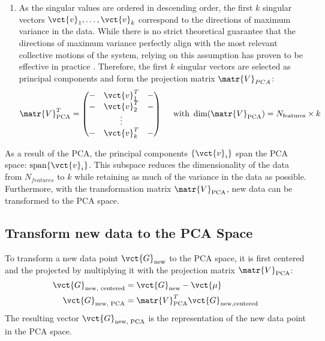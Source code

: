 \begin{enumerate}
    \item As the singular values are ordered in descending order, the first $k$ singular vectors $\vct{v}_1, \dots, \vct{v}_k$ correspond to the directions of maximum variance in the data.
    While there is no strict theoretical guarantee that the directions of maximum variance perfectly align with the most relevant collective motions of the system, 
    relying on this assumption has proven to be effective in practice \cite{Schaefer2025} \cite{sicard:hal-00994220}. 
    Therefore, the first $k$ singular vectors are selected as principal components and form the projection matrix $\matr{V}_{PCA}$:
    \begin{align}
    \matr{V}_{\text{PCA}}^T =
    \begin{pmatrix}
        - & \vct{v}_1^T & - \\
        - & \vct{v}_2^T & - \\
        & \vdots & \\
        - & \vct{v}_k^T & -
    \end{pmatrix}
    \quad  \text{ with } \dim(\matr{V}_{\text{PCA}}) = N_{\text{features}} \times k
    \end{align}

\end{enumerate}
As a result of the PCA, the principal components $\{\vct{v}_i\}$ span the PCA space: $\operatorname{span}\{\vct{v}_i\}$.
This subspace reduces the dimensionality of the data from $N_{features}$ to $k$ while retaining as much of the variance in the data as possible.
Furthermore, with the transformation matrix $\matr{V}_{\text{PCA}}$, new data can be transformed to the PCA space.

\subsection{Transform new data to the PCA Space}
\label{sec:transform_pca}
To transform a new data point $\vct{G}_{\text{new}}$ to the PCA space, it is first centered and the projected by multiplying it with the projection matrix $\matr{V}_{\text{PCA}}$:
\begin{align}
\vct{G}_{\text{new, centered}} &= \vct{G}_{\text{new}} - \vct{\mu} \\
\vct{G}_{\text{new, PCA}} &= \matr{V}_{\text{PCA}}^T \vct{G}_{\text{new}, \text{centered}}
\end{align}
The resulting vector $\vct{G}_{\text{new, PCA}}$ is the representation of the new data point in the PCA space.


